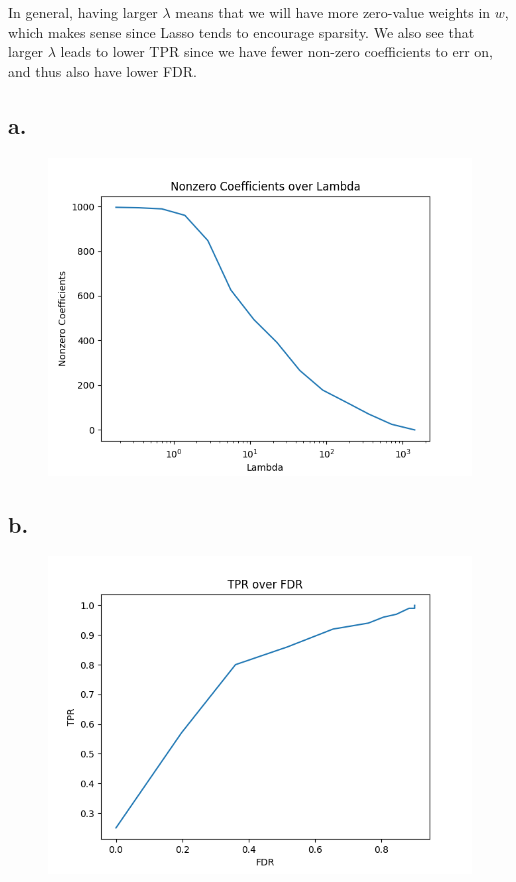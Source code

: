 \documentclass{article}
\newcommand{\1}{\mathbf{1}}
\begin{document}
{In general, having larger $\lambda$ means that we will have more zero-value weights in $w$, which makes sense since Lasso tends to encourage sparsity. We also see that larger $\lambda$ leads to lower TPR since we have fewer non-zero coefficients to err on, and thus also have lower FDR.

\newpage

\subsection*{a.}

\begin{figure}[h]
  \centering
  \includegraphics[width=120mm]{../hw2-code/results/a4_a.png}
\end{figure}

\subsection*{b.}

\begin{figure}[h]
  \centering
  \includegraphics[width=120mm]{../hw2-code/results/a4_b.png}
\end{figure}

\newpage

}
\end{document}

